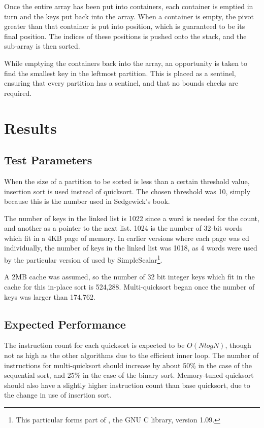 Once the entire array has been put into containers, each container is emptied
in turn and the keys put back into the array. When a container is empty, the
pivot greater than that container is put into position, which is guaranteed to
be its final position.  The indices of these positions is pushed onto the
stack, and the sub-array is then sorted.

While emptying the containers back into the array, an opportunity is taken to
find the smallest key in the leftmost partition. This is placed as a sentinel,
ensuring that every partition has a sentinel, and that no bounds checks are
required.

\section{Results}

\subsection{Test Parameters}

When the size of a partition to be sorted is less than a certain
threshold value, insertion sort is used instead of quicksort. The
chosen threshold was 10, simply because this is the number used in
Sedgewick's book.

The number of keys in the linked list is 1022 since a word is needed for the
count, and another as a pointer to the next list. 1024 is the number of 32-bit
words which fit in a 4KB page of memory. In earlier versions where each page was
ed individually, the number of keys in the linked list was 1018,
as 4 words were used by the particular version of  used by
SimpleScalar\footnote{This particular  forms part of
, the GNU C library, version 1.09.}.

A 2MB cache was assumed, so the number of 32 bit integer keys which fit in the
cache for this in-place sort is 524,288. Multi-quicksort began once the number
of keys was larger than 174,762.

\subsection{Expected Performance}

The instruction count for each quicksort is expected to be $O(NlogN)$, though
not as high as the other algorithms due to the efficient inner loop.  The number
of instructions for multi-quicksort should increase by about 50\% in the case of
the sequential sort, and 25\% in the case of the binary sort. Memory-tuned
quicksort should also have a slightly higher instruction count than base
quicksort, due to the change in use of insertion sort.

